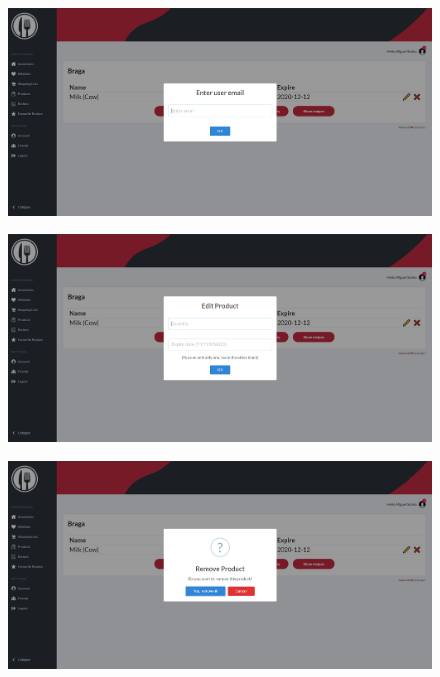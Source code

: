 \documentclass[a4paper]{report}
\begin{document}
    \begin{figure}[H]
        \centering
            \includegraphics[width=\textwidth]{images/produto_final/partilhar_com_outro_utilizador.png}
    \end{figure}

    \begin{figure}[H]
        \centering
            \includegraphics[width=\textwidth]{images/produto_final/editar_produto.png}
    \end{figure}

    \begin{figure}[H]
        \centering
            \includegraphics[width=\textwidth]{images/produto_final/eliminar_produto.png}
    \end{figure}
\end{document}
